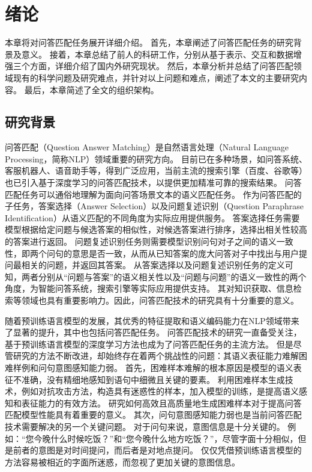 \chapter{绪论}

本章将对问答匹配任务展开详细介绍。
首先，本章阐述了问答匹配任务的研究背景及意义。
接着，本章总结了前人的科研工作，分别从基于表示、交互和数据增强三个方面，详细介绍了国内外研究现状。
然后，本章分析并总结了问答匹配领域现有的科学问题及研究难点，并针对以上问题和难点，阐述了本文的主要研究内容。
最后，本章简述了全文的组织架构。

\section{研究背景}


问答匹配（Question Answer Matching）是自然语言处理（Natural Language Processing，简称NLP）领域重要的研究方向。
目前已在多种场景，如问答系统、客服机器人、语音助手等，得到广泛应用，当前主流的搜索引擎（百度、谷歌等）也已引入基于深度学习的问答匹配技术，以提供更加精准可靠的搜索结果。
问答匹配任务可以通俗地理解为面向问答场景文本的语义匹配任务。
作为问答匹配的子任务，答案选择（Answer Selection）以及问题复述识别（Question Paraphrase Identification）从语义匹配的不同角度为实际应用提供服务。
答案选择任务需要模型根据给定问题与候选答案的相似性，对候选答案进行排序，选择出相关性较高的答案进行返回。
问题复述识别任务则需要模型识别问句对子之间的语义一致性，即两个问句的意思是否一致，从而从已知答案的庞大问答对子中找出与用户提问最相关的问题，并返回其答案。
从答案选择以及问题复述识别任务的定义可知，两者分别从“问题与答案”的语义相关性以及“问题与问题”的语义一致性的两个角度，为智能问答系统，搜索引擎等实际应用提供支持。
其对知识获取、信息检索等领域也具有重要影响力。因此，问答匹配技术的研究具有十分重要的意义。

随着预训练语言模型的发展，其优秀的特征提取和语义编码能力在NLP领域带来了显著的提升，其中也包括问答匹配任务。
问答匹配技术的研究一直备受关注，基于预训练语言模型的深度学习方法也成为了问答匹配任务的主流方法。
但是尽管研究的方法不断改进，却始终存在着两个挑战性的问题：其语义表征能力难解困难样例和问句意图感知能力弱。
首先，困难样本难解的根本原因是模型的语义表征不准确，没有精细地感知到语句中细微且关键的要素。
利用困难样本生成技术，例如对抗攻击方法，构造具有迷惑性的样本，加入模型的训练，是提高语义感知和表征能力的有效方法。
研究如何高效且高质量地生成困难样本对于提高问答匹配模型性能具有着重要的意义。
其次，问句意图感知能力弱也是当前问答匹配技术需要解决的另一个关键问题。
对于问句来说，意图信息是十分关键的。
例如：“您今晚什么时候吃饭？”和“您今晚什么地方吃饭？”，尽管字面十分相似，但是前者的意图是对时间提问，而后者是对地点提问。
仅仅凭借预训练语言模型的方法容易被相近的字面所迷惑，而忽视了更加关键的意图信息。


